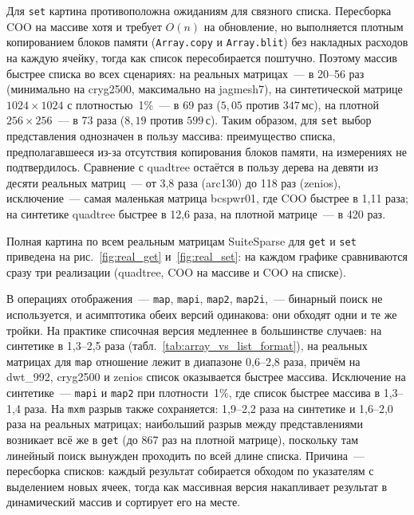\documentclass[a4paper]{article}
\begin{document}
Для \texttt{set} картина противоположна ожиданиям для связного списка. Пересборка COO на массиве хотя и требует $O(n)$ на обновление, но выполняется плотным копированием блоков памяти (\texttt{Array.copy} и \texttt{Array.blit}) без накладных расходов на каждую ячейку, тогда как список пересобирается поштучно. Поэтому массив быстрее списка во всех сценариях: на реальных матрицах~--- в 20--56 раз (минимально на cryg2500, максимально на jagmesh7), на синтетической матрице $1024\times1024$ с плотностью~1\%~--- в 69 раз ($5{,}05$ против $347$\,мс), на плотной $256\times256$~--- в 73 раза ($8{,}19$ против $599$\,с). Таким образом, для \texttt{set} выбор представления однозначен в пользу массива: преимущество списка, предполагавшееся из-за отсутствия копирования блоков памяти, на измерениях не подтвердилось. Сравнение с quadtree остаётся в пользу дерева на девяти из десяти реальных матриц~--- от 3,8 раза (arc130) до 118 раз (zenios), исключение~--- самая маленькая матрица bcspwr01, где COO быстрее в 1,11 раза; на синтетике quadtree быстрее в 12,6 раза, на плотной матрице~--- в 420 раз.

Полная картина по всем реальным матрицам SuiteSparse для \texttt{get} и \texttt{set} приведена на рис.~\ref{fig:real_get} и~\ref{fig:real_set}: на каждом графике сравниваются сразу три реализации (quadtree, COO на массиве и COO на списке).

В операциях отображения~--- \texttt{map}, \texttt{mapi}, \texttt{map2}, \texttt{map2i},~--- бинарный поиск не используется, и асимптотика обеих версий одинакова: они обходят одни и те же тройки. На практике списочная версия медленнее в большинстве случаев: на синтетике в 1,3--2,5 раза (табл.~\ref{tab:array_vs_list_format}), на реальных матрицах для \texttt{map} отношение лежит в диапазоне 0,6--2,8 раза, причём на dwt\_992, cryg2500 и zenios список оказывается быстрее массива. Исключение на синтетике~--- \texttt{mapi} и \texttt{map2} при плотности~1\%, где список быстрее массива в 1,3--1,4 раза. На \texttt{mxm} разрыв также сохраняется: 1,9--2,2 раза на синтетике и 1,6--2,0 раза на реальных матрицах; наибольший разрыв между представлениями возникает всё же в \texttt{get} (до 867 раз на плотной матрице), поскольку там линейный поиск вынужден проходить по всей длине списка. Причина~--- пересборка списков: каждый результат собирается обходом по указателям с выделением новых ячеек, тогда как массивная версия накапливает результат в динамический массив и сортирует его на месте.
\end{document}
